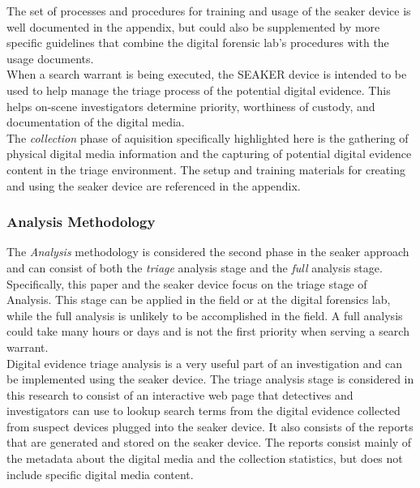 \documentclass[12pt]{article}
\begin{document}
The set of processes and procedures for training and usage of the \gls{seaker} device is well
documented in the appendix, but could also be supplemented by more specific guidelines that
combine the digital forensic lab's procedures with the usage documents.\\

When a search warrant is being executed, the SEAKER device is intended to be used to help
manage the triage process of the potential digital evidence.  This helps on-scene investigators
determine priority, worthiness of custody, and documentation of the digital media\cite{hitchcock2016tiered}.\\ 

The {\em collection} phase of aquisition specifically highlighted here is the gathering
of physical digital media information and the capturing of potential digital evidence content
in the triage environment.  The setup and training materials for creating and using the
\gls{seaker} device are referenced in the appendix.\\

\subsubsection{Analysis Methodology}

The {\em Analysis} methodology is considered the second phase in the \gls{seaker} approach and 
can consist of both the {\em triage} analysis stage and the {\em full} analysis stage.
Specifically, this paper and the \gls{seaker} device focus on the triage stage of Analysis.  This
stage can be applied in the field or at the digital forensics lab, while the full analysis
is unlikely to be accomplished in the field.  A full analysis could take many hours or days
and is not the first priority when serving a search warrant.\\

Digital evidence triage analysis is a very useful part of an investigation and can be 
implemented using the \gls{seaker} device.  The triage analysis stage is considered in this research
to consist of an interactive web page that detectives and investigators can use to 
lookup search terms from the digital evidence collected from suspect devices plugged into the
\gls{seaker} device.  It also consists of the reports that are generated and stored on the
\gls{seaker} device.  The reports consist mainly of the metadata about the digital media and the
collection statistics, but does not include specific digital media content.\\
\end{document}
